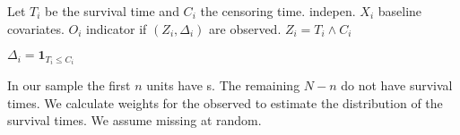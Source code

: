 Let
$T_i$ be the survival time and $C_i$ the censoring time. indepen.
$X_i$ baseline covariates.
$O_i$ indicator if $(Z_i,\Delta_i)$ are observed.
$Z_i=T_i\land C_i$

$
\Delta_i
=
\mathbf{1}
_
{T_i\le C_i}
$

In our sample 
the first $n$ units have s.
The remaining 
$N-n$ do not have survival times.
We calculate weights for the observed to estimate the distribution of the survival times.
We assume missing at random.

